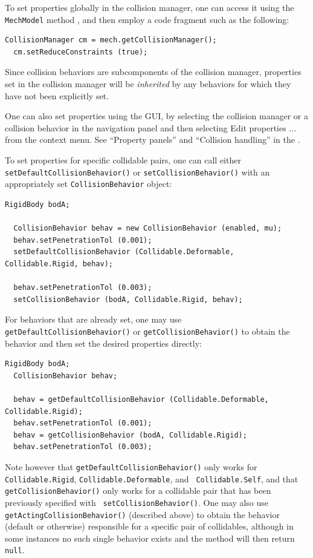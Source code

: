 To set properties globally in the collision manager, one can
access it using the {\tt MechModel} method
,
and then employ a code fragment such as the following:
%
\begin{lstlisting}[]
  CollisionManager cm = mech.getCollisionManager();
  cm.setReduceConstraints (true);
\end{lstlisting}
%
Since collision behaviors are subcomponents of the collision manager,
properties set in the collision manager will be {\it inherited} by any
behaviors for which they have not been explicitly set.

\begin{sideblock}
One can also set properties using the GUI, by selecting the collision
manager or a collision behavior in the navigation panel and then
selecting {\sf Edit properties ...}  from the context menu.  See
``Property panels'' and ``Collision handling'' in the
.
\end{sideblock}

To set properties for specific collidable pairs, one can call either
{\tt setDefaultCollisionBehavior()} or\pdfbreak
{\tt setCollisionBehavior()}
with an appropriately set {\tt CollisionBehavior} object:
%
\begin{lstlisting}[]
  RigidBody bodA;

  CollisionBehavior behav = new CollisionBehavior (enabled, mu);
  behav.setPenetrationTol (0.001);
  setDefaultCollisionBehavior (Collidable.Deformable, Collidable.Rigid, behav);

  behav.setPenetrationTol (0.003);
  setCollisionBehavior (bodA, Collidable.Rigid, behav);
\end{lstlisting}
%
For behaviors that are already set, one may use {\tt
getDefaultCollisionBehavior()} or {\tt getCollisionBehavior()} to
obtain the behavior and then set the desired properties directly:
%
\begin{lstlisting}[]
  RigidBody bodA;
  CollisionBehavior behav;

  behav = getDefaultCollisionBehavior (Collidable.Deformable, Collidable.Rigid);
  behav.setPenetrationTol (0.001);
  behav = getCollisionBehavior (bodA, Collidable.Rigid);
  behav.setPenetrationTol (0.003);
\end{lstlisting}
%
Note however that {\tt getDefaultCollisionBehavior()} only works for
{\tt Collidable.Rigid}, {\tt Collidable.Deformable}, and {\tt
Collidable.Self}, and that {\tt getCollisionBehavior()} only works for
a collidable pair that has been previously specified with {\tt
setCollisionBehavior()}. One may also use {\tt
getActingCollisionBehavior()} (described above) to obtain the behavior
(default or otherwise) responsible for a specific pair of collidables,
although in some instances no such single behavior exists and the
method will then return {\tt null}.

